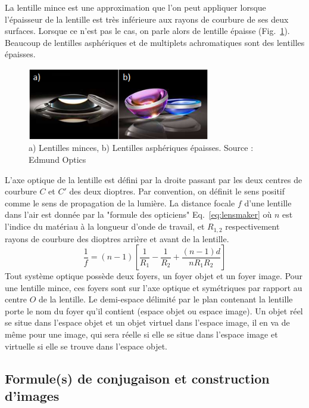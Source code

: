 \documentclass[a4paper]{book}
\begin{document}
La lentille mince est une approximation que l'on peut appliquer lorsque l'épaisseur de la lentille est très inférieure aux rayons de courbure de ses deux surfaces. Lorsque ce n'est pas le cas, on parle alors de lentille épaisse (Fig.~\ref{fig:lentille_mince}). Beaucoup de lentilles asphériques et de multiplets achromatiques sont des lentilles épaisses.
\begin{figure}[!htbp]
\begin{center}
\includegraphics[width=8cm]{pictures/lenses.png}
\end{center}
\caption{a) Lentilles minces, b) Lentilles asphériques épaisses. Source : \textcopyright Edmund Optics }
\label{fig:lentille_mince}
\end{figure}

L'axe optique de la lentille est défini par la droite passant par les deux centres de courbure $C$ et $C'$ des deux dioptres. Par convention, on définit le sens positif comme le sens de propagation de la lumière.  La distance focale $f$ d'une lentille dans l'air est donnée par la "formule des opticiens" Eq.~\ref{eq:lensmaker} où $n$ est l'indice du matériau à la longueur d'onde de travail, et $R_{1, 2}$ respectivement rayons de courbure des dioptres arrière et avant de la lentille. 
\begin{equation}
\label{eq:lensmaker}
\frac{1}{f}=(n-1)\left[\frac{1}{R_1}-\frac{1}{R_2}+\frac{(n-1)d}{n R_1 R_2}\right]
\end{equation}
Tout système optique possède deux foyers, un foyer objet et un foyer image. Pour une lentille mince, ces foyers sont sur l'axe optique et symétriques par rapport au centre $O$ de la lentille. Le demi-espace délimité par le plan contenant la lentille porte le nom du foyer qu'il contient (espace objet ou espace image). Un objet réel se situe dans l'espace objet et un objet virtuel dans l'espace image, il en va de même pour une image, qui sera réelle si elle se situe dans l'espace image et virtuelle si elle se trouve dans l'espace objet.


\subsection{Formule(s) de conjugaison et construction d'images}
\end{document}
